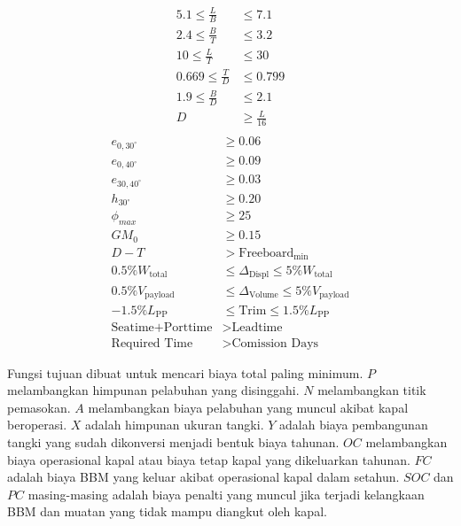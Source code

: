 \begin{align}
    5.1 \leq \frac{L}{B} &\leq 7.1 \label{crasio1} \\
    2.4 \leq \frac{B}{T} &\leq 3.2 \label{crasio2} \\
    10 \leq \frac{L}{T} &\leq 30 \label{crasio3} \\
    0.669 \leq \frac{T}{D} &\leq 0.799 \label{crasio4} \\
    1.9 \leq \frac{B}{D} &\leq 2.1 \label{crasio5} \\
    D &\geq \frac{L}{16} \label{crasio6} \\
\end{align}
\begin{align}
    e_{0,30^\circ} &\geq 0.06 \label{cstabil1} \\
    e_{0,40^\circ} &\geq 0.09 \label{cstabil2} \\
    e_{30,40^\circ} &\geq 0.03 \label{cstabil3} \\
    h_{30^\circ} &\geq 0.20 \label{cstabil4} \\
    \phi_{max} &\geq 25 \label{cstabil5} \\
    GM_0 &\geq 0.15 \label{cstabil6} \\
    D - T &> \text{Freeboard}_{\text{min}} \label{cfreeboard} \\
    0.5\% W_{\text{total}} &\leq \Delta_{\text{Displ}} \leq 5\% W_{\text{total}} \label{cberatkapal} \\
    0.5\% V_{\text{payload}} &\leq \Delta_{\text{Volume}} \leq 5\% V_{\text{payload}} \label{cvolumekapal} \\
    -1.5\% L_{\text{PP}} &\leq \text{Trim} \leq 1.5\% L_{\text{PP}} \label{ctrim} \\
    \text{Seatime} + \text{Porttime} &> \text{Leadtime} \label{cwaktu1} \\
    \text{Required Time} &> \text{Comission Days} \label{cwaktu2}
\end{align}

    Fungsi tujuan dibuat untuk mencari biaya total paling minimum. $P$ melambangkan himpunan pelabuhan yang disinggahi. $N$ melambangkan titik pemasokan. $A$ melambangkan biaya pelabuhan yang muncul akibat kapal beroperasi. $X$ adalah himpunan ukuran tangki. $Y$ adalah biaya pembangunan tangki yang sudah dikonversi menjadi bentuk biaya tahunan. $OC$ melambangkan biaya operasional kapal atau biaya tetap kapal yang dikeluarkan tahunan. $FC$ adalah biaya BBM yang keluar akibat operasional kapal dalam setahun. $SOC$ dan $PC$ masing-masing adalah biaya penalti yang muncul jika terjadi kelangkaan BBM dan muatan yang tidak mampu diangkut oleh kapal.

